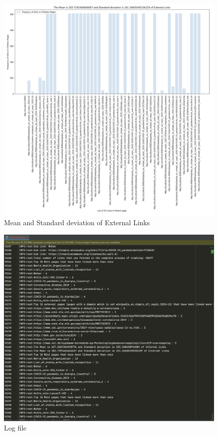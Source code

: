 \documentclass{resources/WeSTassignment}
\begin{document}
\begin{figure}[h]
    \centering
    \includegraphics[scale=0.5]{resources/children_external.png}
    \caption{Mean and Standard deviation of External Links}  
    \label{fig:Mean and Standard deviation of External Links}
\end{figure}
\begin{figure}[h]
    \centering
    \includegraphics[scale=0.5]{resources/log-file.png}
    \caption{Log file}  
    \label{fig:Log file}
\end{figure}
\end{document}
